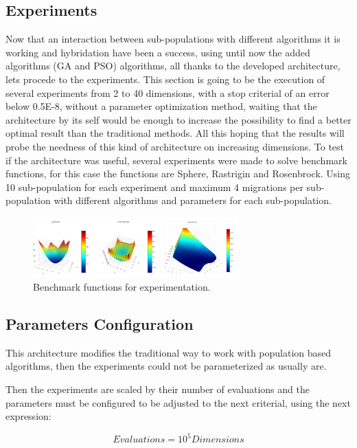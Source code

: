\documentclass[runningheads]{llncs}
\begin{document}
\subsection{Experiments}
Now that an interaction between sub-populations with different algorithms it is working and  hybridation have been a success, using until now the added algorithms (GA and PSO) algorithms, all thanks to the 
developed architecture, lets procede to the experiments.
This section is going to be the execution of several experiments from 2 to 40 dimensions, with a stop criterial 
of an error below  0.5E-8, without a parameter optimization method, waiting that the architecture by its self
would be enough to increase the possibility to find a better optimal result than the traditional methods.
All this hoping that the results will probe the needness of this kind of architecture on increasing dimensions.
To test if the architecture was useful, several experiments were made to solve
benchmark functions, for this case the functions are Sphere, Rastrigin and Rosenbrock.
Using 10 sub-population for each experiment and maximum 4 migrations per sub-population with different algorithms and parameters for each sub-population.

\begin{figure}[htp]
  \centering
    \includegraphics[width=0.7\textwidth]{benchmark.png}
    \caption{Benchmark functions for experimentation.} \label{fig1}
    \end{figure}

\subsection{Parameters Configuration} 

This architecture modifies the traditional way to work with population based algorithms, then the experiments 
could not be parameterized as usually are.

Then the experiments are scaled by their number of evaluations and the
parameters must be configured to be adjusted to the next criterial, using the next expression:

\begin{equation}
    \label{eq:hesitancy-interpretation}
   Evaluations = 10^{5} Dimensions
   \end{equation}
\end{document}
